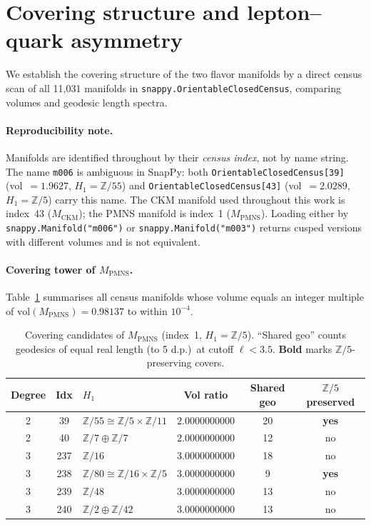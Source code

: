 \documentclass[12pt]{article}
\theoremstyle{definition}
\begin{document}
\section{Covering structure and lepton--quark asymmetry}
\label{sec:covering}

We establish the covering structure of the two flavor manifolds by a
direct census scan of all 11{,}031 manifolds in
\texttt{snappy.OrientableClosedCensus}, comparing volumes and geodesic
length spectra.

\paragraph{Reproducibility note.}
Manifolds are identified throughout by their \emph{census index}, not
by name string. The name \texttt{m006} is ambiguous in SnapPy: both
\texttt{OrientableClosedCensus[39]} (vol~$=1.9627$, $H_1=\mathbb{Z}/55$)
and \texttt{OrientableClosedCensus[43]} (vol~$=2.0289$, $H_1=\mathbb{Z}/5$)
carry this name. The CKM manifold used throughout this work is
index~43 ($M_\text{CKM}$); the PMNS manifold is index~1 ($M_\text{PMNS}$).
Loading either by \texttt{snappy.Manifold("m006")} or \texttt{snappy.Manifold("m003")}
returns cusped versions with different volumes and is not equivalent.

\paragraph{Covering tower of $M_\mathrm{PMNS}$.}
Table~\ref{tab:covering} summarises all census manifolds whose volume
equals an integer multiple of $\mathrm{vol}(M_\text{PMNS})=0.98137$
to within $10^{-4}$.

\begin{table}[ht]
\caption{Covering candidates of $M_\text{PMNS}$ (index~1, $H_1=\mathbb{Z}/5$).
``Shared geo'' counts geodesics of equal real length (to 5 d.p.)\ at cutoff
$\ell < 3.5$. \textbf{Bold} marks $\mathbb{Z}/5$-preserving covers.}
\label{tab:covering}
\centering\small
\begin{tabular}{cclccc}
\toprule
Degree & Idx & $H_1$ & Vol ratio & Shared geo & $\mathbb{Z}/5$ preserved \\
\midrule
2 & 39  & $\mathbb{Z}/55 \cong \mathbb{Z}/5{\times}\mathbb{Z}/11$ & $2.0000000000$ & 20 & \textbf{yes} \\
2 & 40  & $\mathbb{Z}/7 \oplus \mathbb{Z}/7$                      & $2.0000000000$ & 12 & no           \\
3 & 237 & $\mathbb{Z}/16$                                         & $3.0000000000$ & 18 & no           \\
3 & 238 & $\mathbb{Z}/80 \cong \mathbb{Z}/16{\times}\mathbb{Z}/5$ & $3.0000000000$ &  9 & \textbf{yes} \\
3 & 239 & $\mathbb{Z}/48$                                         & $3.0000000000$ & 13 & no           \\
3 & 240 & $\mathbb{Z}/2 \oplus \mathbb{Z}/42$                     & $3.0000000000$ & 13 & no           \\
\bottomrule
\end{tabular}
\end{table}
\end{document}
